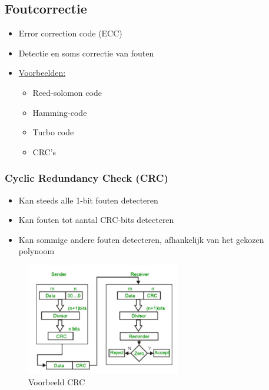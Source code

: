 \documentclass{article}
\begin{document}
\subsection{Foutcorrectie}
\begin{itemize}
    \item Error correction code (ECC)
    \item Detectie en soms correctie van fouten
    \item \underline{Voorbeelden:}
    \begin{itemize}
        \item Reed-solomon code
        \item Hamming-code 
        \item Turbo code
        \item CRC's
    \end{itemize}
\end{itemize}

\subsubsection{Cyclic Redundancy Check (CRC)}
\begin{itemize}
    \item Kan steeds alle 1-bit fouten detecteren
    \item Kan fouten tot aantal CRC-bits detecteren
    \item Kan sommige andere fouten detecteren, afhankelijk van het gekozen polynoom
\end{itemize}

\begin{figure}[H]
    \centering
    \includegraphics[width=0.6\textwidth]{Screenshot_20200420_121925.png}
    \caption{Voorbeeld CRC}
\end{figure}
\end{document}
